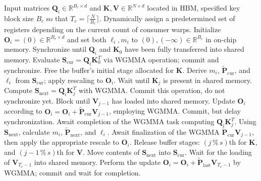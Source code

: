 \begin{algorithm}[H]
    \caption{\small\label{alg:flash3_wgmma}\textsc{FlashAttention-3} consumer warpgroup forward pass}
    \begin{algorithmic}[1]
      \REQUIRE  Input matrices $\mathbf{Q}_i \in \mathbb{R}^{B_r \times d}$ and $\mathbf{K}, \mathbf{V} \in \mathbb{R}^{N \times d}$ located in HBM, specified key block size $B_c$ so that $T_c = \lceil \frac{N}{B_c} \rceil$.
      \STATE Dynamically assign a predetermined set of registers depending on the current count of consumer warps.
      \STATE Initialize $\mathbf{O}_i = (0) \in \mathbb{R}^{B_r \times d}$ and set both $\ell_i, m_i$ to $(0), (-\infty) \in \mathbb{R}^{B_r}$ in on-chip memory.
      \STATE Synchronize until $\mathbf{Q}_i$ and $\mathbf{K}_0$ have been fully transferred into shared memory.
      \STATE Evaluate $\mathbf{S}_{\mathrm{cur}} = \mathbf{Q}_i \mathbf{K}_0^T$ via WGMMA operation; commit and synchronize.
      \STATE Free the buffer's initial stage allocated for $\mathbf{K}$.
      \STATE Derive $m_{i}$, $\tilde{\mathbf{P}}_{\mathrm{cur}}$, and $\ell_{i}$ from $\mathbf{S}_{\mathrm{cur}}$; apply rescaling to $\mathbf{O}_i$.
        \STATE Wait until $\mathbf{K}_j$ is present in shared memory.
        \label{code:mainloop_start}
        \STATE Compute $\mathbf{S}_{\mathrm{next}} = \mathbf{Q}_i \mathbf{K}_{j}^T$ with WGMMA. Commit this operation, do not synchronize yet. \label{code:first_wgmma}
        \STATE Block until $\mathbf{V}_{j-1}$ has loaded into shared memory.
        \STATE Update $\mathbf{O}_{i}$ according to $\mathbf{O}_{i} = \mathbf{O}_{i} + \tilde{\mathbf{P}}_{\mathrm{cur}} \mathbf{V}_{j-1}$, employing WGMMA. Commit, but delay synchronization. \label{code:second_wgmma}
        \STATE Await completion of the WGMMA task computing $\mathbf{Q}_i \mathbf{K}_{j}^T$.
        \STATE Using $\mathbf{S}_{\mathrm{next}}$, calculate $m_{i}$, $\tilde{\mathbf{P}}_{\mathrm{next}}$, and $\ell_{i}$. \label{code:softmax}
        \STATE Await finalization of the WGMMA $\tilde{\mathbf{P}}_{\mathrm{cur}} \mathbf{V}_{j-1}$, then apply the appropriate rescale to $\mathbf{O}_i$.
        \STATE Release buffer stages: $(j\,\%\,s)$th for $\mathbf{K}$, and $(j-1\,\%\,s)$th for $\mathbf{V}$.
        \STATE Move contents of $\mathbf{S}_{\mathrm{next}}$ into $\mathbf{S}_{\mathrm{cur}}$.
        \label{code:mainloop_end}
      \ENDFOR \STATE Wait for the loading of $\mathbf{V}_{T_c - 1}$ into shared memory.
      \STATE Perform the update $\mathbf{O}_{i} = \mathbf{O}_{i} + \tilde{\mathbf{P}}_{\mathrm{last}} \mathbf{V}_{T_c - 1}$ by WGMMA; commit and wait for completion.


\end{algorithmic}
\end{algorithm}
